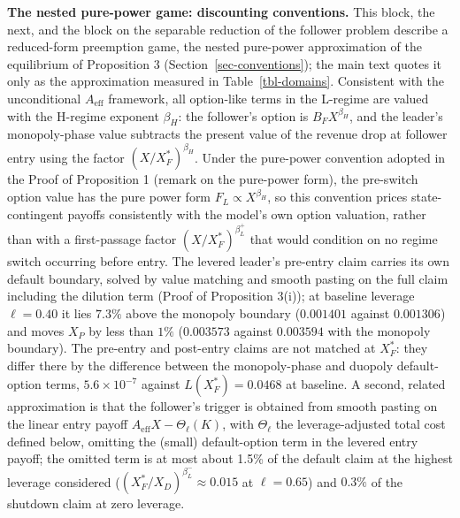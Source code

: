 \documentclass[
  11pt,
  letterpaper,
]{scrartcl}
\begin{document}
\textbf{The nested pure-power game: discounting conventions.} This
block, the next, and the block on the separable reduction of the
follower problem describe a reduced-form preemption game, the nested
pure-power approximation of the equilibrium of Proposition 3
(Section~\ref{sec-conventions}); the main text quotes it only as the
approximation measured in Table~\ref{tbl-domains}. Consistent with the
unconditional \(A_{\text{eff}}\) framework, all option-like terms in the
L-regime are valued with the H-regime exponent \(\beta_H\): the
follower's option is \(B_F X^{\beta_H}\), and the leader's
monopoly-phase value subtracts the present value of the revenue drop at
follower entry using the factor \((X/X_F^*)^{\beta_H}\). Under the
pure-power convention adopted in the Proof of Proposition 1 (remark on
the pure-power form), the pre-switch option value has the pure power
form \(F_L \propto X^{\beta_H}\), so this convention prices
state-contingent payoffs consistently with the model's own option
valuation, rather than with a first-passage factor
\((X/X_F^*)^{\beta_L^+}\) that would condition on no regime switch
occurring before entry. The levered leader's pre-entry claim carries its
own default boundary, solved by value matching and smooth pasting on the
full claim including the dilution term (Proof of Proposition 3(i)); at
baseline leverage \(\ell = 0.40\) it lies \(7.3\%\) above the monopoly
boundary (\(0.001401\) against \(0.001306\)) and moves \(X_P\) by less
than \(1\%\) (\(0.003573\) against \(0.003594\) with the monopoly
boundary). The pre-entry and post-entry claims are not matched at
\(X_F^*\): they differ there by the difference between the
monopoly-phase and duopoly default-option terms, \(5.6 \times 10^{-7}\)
against \(L(X_F^*) = 0.0468\) at baseline. A second, related
approximation is that the follower's trigger is obtained from smooth
pasting on the linear entry payoff
\(A_{\text{eff}} X - \Theta_\ell(K)\), with \(\Theta_\ell\) the
leverage-adjusted total cost defined below, omitting the (small)
default-option term in the levered entry payoff; the omitted term is at
most about 1.5\% of the default claim at the highest leverage considered
(\((X_F^*/X_D)^{\beta_L^-} \approx 0.015\) at \(\ell = 0.65\)) and
\(0.3\%\) of the shutdown claim at zero leverage.
\end{document}

